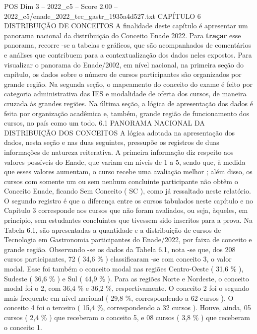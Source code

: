 \begin{textsample}{POS Dim 3 – 2022\_c5 – Score 2.00 – 2022\_c5/enade\_2022\_tec\_gastr\_1935a4d527.txt}  \label{ex:f3_pos_064}
CAPÍTULO 6 DISTRIBUIÇÃO DE CONCEITOS A finalidade deste capítulo é apresentar um panorama nacional da distribuição do Conceito Enade 2022.
Para \textbf{traçar} esse panorama, recorre -se a tabelas e gráficos, que são acompanhados de comentários e análises que contribuem para a contextualização dos dados neles expostos.
Para visualizar o panorama do Enade/2002, em nível nacional, na primeira seção do capítulo, os dados sobre o número de cursos participantes são organizados por grande região.
Na segunda seção, o mapeamento do conceito do exame é feito por categoria administrativa das IES e modalidade de oferta dos cursos, de maneira cruzada às grandes regiões.
Na última seção, a lógica de apresentação dos dados é feita por organização acadêmica e, também, grande região de funcionamento dos cursos, no país como um todo. 6.1 PANORAMA NACIONAL DA DISTRIBUIÇÃO DOS CONCEITOS A lógica adotada na apresentação dos dados, nesta seção e nas duas seguintes, pressupõe os registros de duas informações de natureza reiterativa.
A primeira informação diz respeito aos valores possíveis do Enade, que variam em níveis de 1 a 5, sendo que, à medida que esses valores aumentam, o curso recebe uma avaliação melhor ; além disso, os cursos com somente um ou sem nenhum concluinte participante não obtêm o Conceito Enade, ficando Sem Conceito ( SC ), como já ressaltado neste relatório.
O segundo registro é que a diferença entre os cursos tabulados neste capítulo e no Capítulo 3 corresponde aos cursos que não foram avaliados, ou seja, àqueles, em princípio, sem estudantes concluintes que tivessem sido inscritos para a prova.
Na Tabela 6.1, são apresentadas a quantidade e a distribuição de cursos de Tecnologia em Gastronomia participantes do Enade/2022, por faixa de conceito e grande região.
Observando -se os dados da Tabela 6.1, nota -se que, dos 208 cursos participantes, 72 ( 34,6 \% ) classificaram -se com conceito 3, o valor modal.
Esse foi também o conceito modal nas regiões Centro-Oeste ( 31,6 \% ), Sudeste ( 36,6 \% ) e Sul ( 44,9 \% ).
Para as regiões Norte e Nordeste, o conceito modal foi o 2, com 36,4 \% e 36,2 \%, respectivamente.
O conceito 2 foi o segundo mais frequente em nível nacional ( 29,8 \%, correspondendo a 62 cursos ).
O conceito 4 foi o terceiro ( 15,4 \%, correspondendo a 32 cursos ).
Houve, ainda, 05 cursos ( 2,4 \% ) que receberam o conceito 5, e 08 cursos ( 3,8 \% ) que receberam o conceito 1.

\end{textsample}
